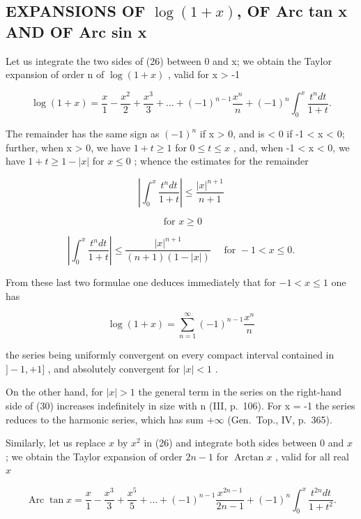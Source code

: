 \subsection{\texorpdfstring{EXPANSIONS OF \(\log(1 + x)\), OF Arc tan x AND OF Arc sin x}{EXPANSIONS OF LOG(1 + X), ARC TAN X AND ARC SIN X}}

Let us integrate the two sides of (26) between 0 and x; we obtain the Taylor expansion of order n of \(\log(1 + x)\) , valid for x \textgreater{} -1

\[
\log (1 + x) = \frac {x}{1} - \frac {x ^ {2}}{2} + \frac {x ^ {3}}{3} + \dots + (- 1) ^ {n - 1} \frac {x ^ {n}}{n} + (- 1) ^ {n} \int_ {0} ^ {x} \frac {t ^ {n} d t}{1 + t}.\tag{27}
\]

The remainder has the same sign as \((-1)^{n}\) if x \textgreater{} 0, and is \textless{} 0 if -1 \textless{} x \textless{} 0; further, when x \textgreater{} 0, we have \(1 + t \geqslant 1\) for \(0 \leqslant t \leqslant x\) , and, when -1 \textless{} x \textless{} 0, we have \(1 + t \geqslant 1 - |x|\) for \(x \leqslant 0\) ; whence the estimates for the remainder

\[
\left| \int_ {0} ^ {x} \frac {t ^ {n} d t}{1 + t} \right| \leqslant \frac {| x | ^ {n + 1}}{n + 1}
\]

\[
\text { for } x \geqslant 0\tag{28}
\]

\[
\left| \int_ {0} ^ {x} \frac {t ^ {n} d t}{1 + t} \right| \leqslant \frac {| x | ^ {n + 1}}{(n + 1) (1 - | x |)} \quad \text {   for   } - 1 <   x \leqslant 0.\tag{29}
\]

From these last two formulae one deduces immediately that for \(-1 < x \leqslant 1\) one has

\[
\log (1 + x) = \sum_ {n = 1} ^ {\infty} (- 1) ^ {n - 1} \frac {x ^ {n}}{n}\tag{30}
\]

the series being uniformly convergent on every compact interval contained in \(]-1,+1]\) , and absolutely convergent for \(|x|<1\) .

On the other hand, for \(|x| > 1\) the general term in the series on the right-hand side of (30) increases indefinitely in size with n (III, p.~106). For x = -1 the series reduces to the harmonic series, which has sum \(+\infty\) (Gen.~Top., IV, p.~365).

Similarly, let us replace \(x\) by \(x^2\) in (26) and integrate both sides between 0 and \(x\) ; we obtain the Taylor expansion of order \(2n - 1\) for \(\operatorname{Arctan} x\) , valid for all real \(x\)

\[
\operatorname{Arc} \tan x = \frac {x}{1} - \frac {x ^ {3}}{3} + \frac {x ^ {5}}{5} + \dots + (- 1) ^ {n - 1} \frac {x ^ {2 n - 1}}{2 n - 1} + (- 1) ^ {n} \int_ {0} ^ {x} \frac {t ^ {2 n} d t}{1 + t ^ {2}}.\tag{31}
\]

